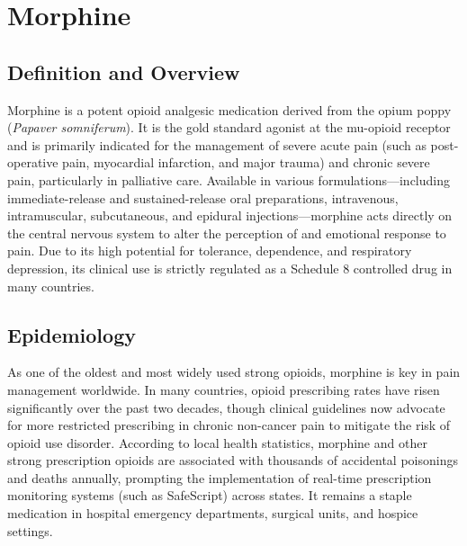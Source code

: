 \chapter{Morphine}

\section*{Definition and Overview}
Morphine is a potent opioid analgesic medication derived from the opium poppy (\textit{Papaver somniferum}). It is the gold standard agonist at the mu-opioid receptor and is primarily indicated for the management of severe acute pain (such as post-operative pain, myocardial infarction, and major trauma) and chronic severe pain, particularly in palliative care. Available in various formulations---including immediate-release and sustained-release oral preparations, intravenous, intramuscular, subcutaneous, and epidural injections---morphine acts directly on the central nervous system to alter the perception of and emotional response to pain. Due to its high potential for tolerance, dependence, and respiratory depression, its clinical use is strictly regulated as a Schedule 8 controlled drug in many countries.

\section*{Epidemiology}
As one of the oldest and most widely used strong opioids, morphine is key in pain management worldwide. In many countries, opioid prescribing rates have risen significantly over the past two decades, though clinical guidelines now advocate for more restricted prescribing in chronic non-cancer pain to mitigate the risk of opioid use disorder. According to local health statistics, morphine and other strong prescription opioids are associated with thousands of accidental poisonings and deaths annually, prompting the implementation of real-time prescription monitoring systems (such as SafeScript) across states. It remains a staple medication in hospital emergency departments, surgical units, and hospice settings.

